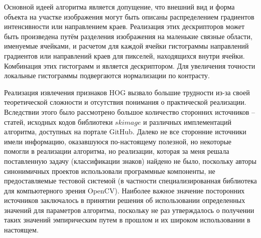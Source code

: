 \documentclass[a4paper, 12pt]{article}
\begin{document}
Основной идеей алгоритма является допущение, что внешний вид и форма объекта на участке изображения могут быть описаны распределением градиентов интенсивности или направлением краев. Реализация этих дескрипторов может быть произведена путём разделения изображения на маленькие связные области, именуемые ячейками, и расчетом для каждой ячейки гистограммы направлений градиентов или направлений краев для пикселей, находящихся внутри ячейки. Комбинация этих гистограмм и является дескриптором. Для увеличения точности локальные гистограммы подвергаются нормализации по контрасту.

Реализация извлечения признаков HOG вызвало большие трудности из-за своей теоретической сложности и отсутствия понимания о практической реализации. Вследствии этого было рассмотрено большое количество сторонних источников -- статей, исходных кодов библиотеки $skimage$ и различных имплементаций алгоритма, доступных на портале GitHub. Далеко не все сторонние источники имели информацию, оказавшуюся по-настоящему полезной, но некоторые помогли в реализации алгоритма, но реализации, которая за меня решала поставленную задачу (классификации знаков) найдено не было, поскольку авторы синонимичных проектов использовали программные компоненты, не предоставляемые тестовой системой (в частности специализированная библиотека для компьютерного зрения OpenCV). Наиболее важное значение посторонних источников заключалось в принятии решения об использовании определенных значений для параметров алгоритма, поскольку не раз утверждалось о получении таких значений эмпирическим путем в прошлом и их широком использовании в настоящем.
\end{document}
